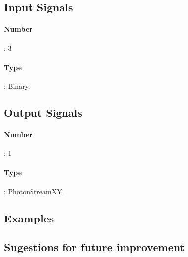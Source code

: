 \subsection*{Input Signals}
\paragraph*{Number}: 3
\paragraph*{Type}: Binary.

\subsection*{Output Signals}
\paragraph*{Number}: 1
\paragraph*{Type}: PhotonStreamXY.

\subsection*{Examples}


\subsection*{Sugestions for future improvement}



